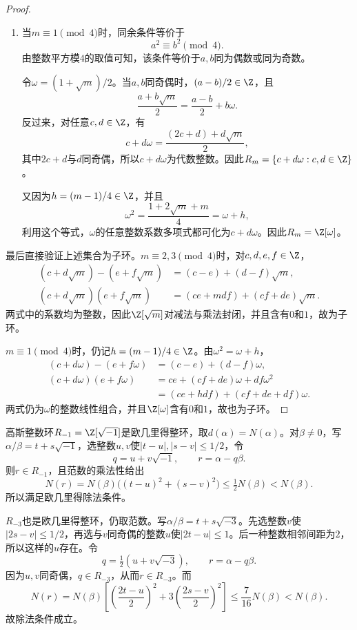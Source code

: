 \begin{proof}
\begin{enumerate}
反过来，若$a,b$均为偶数，则$a^2-mb^2$必被$4$整除。所以此时
\[
R_m=\left\{\frac{a+b\sqrt m}{2}:a,b\in2\Z\right\}
=\{c+d\sqrt m:c,d\in\Z\}.
\]
由于$(\sqrt m)^2=m\in\Z$，$\sqrt m$的任意整数系数多项式都可以化为$c+d\sqrt m$，而这种形式的元素也都属于$\Z[\sqrt m]$。故$R_m=\Z[\sqrt m]$。

\item 当$m\equiv1\pmod4$时，同余条件等价于
\[
a^2\equiv b^2\pmod4.
\]
由整数平方模$4$的取值可知，该条件等价于$a,b$同为偶数或同为奇数。

令$\omega=(1+\sqrt m)/2$。当$a,b$同奇偶时，$(a-b)/2\in\Z$，且
\[
\frac{a+b\sqrt m}{2}=\frac{a-b}{2}+b\omega.
\]
反过来，对任意$c,d\in\Z$，有
\[
c+d\omega=\frac{(2c+d)+d\sqrt m}{2},
\]
其中$2c+d$与$d$同奇偶，所以$c+d\omega$为代数整数。因此$R_m=\{c+d\omega:c,d\in\Z\}$。

又因为$h=(m-1)/4\in\Z$，并且
\[
\omega^2=\frac{1+2\sqrt m+m}{4}=\omega+h,
\]
利用这个等式，$\omega$的任意整数系数多项式都可化为$c+d\omega$。因此$R_m=\Z[\omega]$。
\end{enumerate}

最后直接验证上述集合为子环。$m\equiv2,3\pmod4$时，对$c,d,e,f\in\Z$，
\begin{align*}
(c+d\sqrt m)-(e+f\sqrt m)
&=(c-e)+(d-f)\sqrt m,\\
(c+d\sqrt m)(e+f\sqrt m)
&=(ce+mdf)+(cf+de)\sqrt m.
\end{align*}
两式中的系数均为整数，因此$\Z[\sqrt m]$对减法与乘法封闭，并且含有$0$和$1$，故为子环。

$m\equiv1\pmod4$时，仍记$h=(m-1)/4\in\Z$。由$\omega^2=\omega+h$，
\begin{align*}
(c+d\omega)-(e+f\omega)
&=(c-e)+(d-f)\omega,\\
(c+d\omega)(e+f\omega)
&=ce+(cf+de)\omega+df\omega^2\\
&=(ce+hdf)+(cf+de+df)\omega.
\end{align*}
两式仍为$\omega$的整数线性组合，并且$\Z[\omega]$含有$0$和$1$，故也为子环。
\end{proof}

\begin{example}
高斯整数环$R_{-1}=\Z[\sqrt{-1}]$是欧几里得整环，取$d(\alpha)=N(\alpha)$。对$\beta\ne0$，写$\alpha/\beta=t+s\sqrt{-1}$，选整数$u,v$使$|t-u|,|s-v|\le1/2$，令
\[
q=u+v\sqrt{-1},\qquad r=\alpha-q\beta.
\]
则$r\in R_{-1}$，且范数的乘法性给出
\[
N(r)=N(\beta)\bigl((t-u)^2+(s-v)^2\bigr)
\le\tfrac12N(\beta)<N(\beta).
\]
所以满足欧几里得除法条件。
\end{example}

\begin{example}
$R_{-3}$也是欧几里得整环，仍取范数。写$\alpha/\beta=t+s\sqrt{-3}$。先选整数$v$使$|2s-v|\le1/2$，再选与$v$同奇偶的整数$u$使$|2t-u|\le1$。后一种整数相邻间距为$2$，所以这样的$u$存在。令
\[
q=\tfrac12(u+v\sqrt{-3}),\qquad r=\alpha-q\beta.
\]
因为$u,v$同奇偶，$q\in R_{-3}$，从而$r\in R_{-3}$。而
\[
N(r)=N(\beta)\left[\left(\frac{2t-u}{2}\right)^2
+3\left(\frac{2s-v}{2}\right)^2\right]
\le\frac7{16}N(\beta)<N(\beta).
\]
故除法条件成立。
\end{example}

